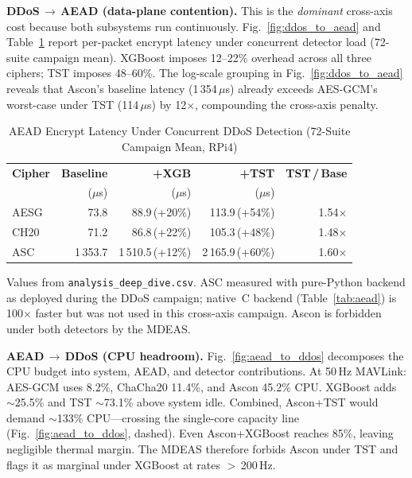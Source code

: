 \medskip
\textbf{DDoS\,$\to$\,AEAD (data-plane contention).}\quad
This is the \emph{dominant} cross-axis cost because both subsystems
run continuously.  Fig.~\ref{fig:ddos_to_aead} and
Table~\ref{tab:aead_cross} report per-packet encrypt latency under
concurrent detector load (72-suite campaign mean).
XGBoost imposes 12--22\% overhead across all three ciphers;
TST imposes 48--60\%.  The log-scale grouping in
Fig.~\ref{fig:ddos_to_aead} reveals that Ascon's baseline latency
(1\,354\,$\mu$s) already exceeds AES-GCM's worst-case under TST
(114\,$\mu$s) by 12$\times$, compounding the cross-axis penalty.

\begin{table}[t]
\centering
\caption{AEAD Encrypt Latency Under Concurrent DDoS Detection
  (72-Suite Campaign Mean, RPi4)}
\label{tab:aead_cross}
\footnotesize
\setlength{\tabcolsep}{3pt}
\begin{tabular}{@{}lrrrr@{}}
\toprule
\textbf{Cipher} &
  \textbf{Baseline} & \textbf{+XGB} & \textbf{+TST} &
  \textbf{TST\,/\,Base} \\
& ($\mu$s) & ($\mu$s) & ($\mu$s) & \\
\midrule
AESG & 73.8  & 88.9\,(+20\%)  & 113.9\,(+54\%) & 1.54$\times$ \\
CH20 & 71.2  & 86.8\,(+22\%)  & 105.3\,(+48\%) & 1.48$\times$ \\
ASC  & 1\,353.7 & 1\,510.5\,(+12\%) & 2\,165.9\,(+60\%) & 1.60$\times$ \\
\bottomrule
\end{tabular}
\begin{tablenotes}
\footnotesize
\item Values from \texttt{analysis\_deep\_dive.csv}.
  ASC measured with pure-Python backend as deployed during the
  DDoS campaign; native~C backend (Table~\ref{tab:aead}) is
  100$\times$ faster but was not used in this cross-axis campaign.
  Ascon is forbidden under both detectors by the MDEAS.
\end{tablenotes}
\end{table}

\textbf{AEAD\,$\to$\,DDoS (CPU headroom).}\quad
Fig.~\ref{fig:aead_to_ddos} decomposes the CPU budget into system,
AEAD, and detector contributions.  At 50\,Hz MAVLink: AES-GCM uses
8.2\%, ChaCha20 11.4\%, and Ascon 45.2\% CPU.  XGBoost adds
$\sim$25.5\% and TST $\sim$73.1\% above system idle.
Combined, Ascon+TST would demand $\sim$133\% CPU---crossing the
single-core capacity line (Fig.~\ref{fig:aead_to_ddos}, dashed).
Even Ascon+XGBoost reaches 85\%, leaving negligible thermal margin.
The MDEAS therefore forbids Ascon under TST and flags it as
marginal under XGBoost at rates $>$\,200\,Hz.

